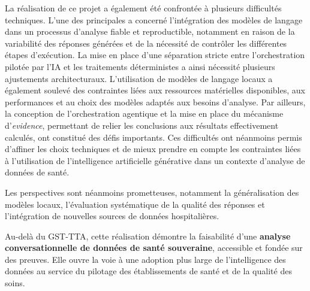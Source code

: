 La réalisation de ce projet a également été confrontée à plusieurs difficultés techniques.
L'une des principales a concerné l'intégration des modèles de langage dans un processus
d'analyse fiable et reproductible, notamment en raison de la variabilité des réponses générées
et de la nécessité de contrôler les différentes étapes d'exécution. La mise en place d'une
séparation stricte entre l'orchestration pilotée par l'IA et les traitements déterministes a
ainsi nécessité plusieurs ajustements architecturaux. L'utilisation de modèles de langage
locaux a également soulevé des contraintes liées aux ressources matérielles disponibles,
aux performances et au choix des modèles adaptés aux besoins d'analyse. Par ailleurs, la
conception de l'orchestration agentique et la mise en place du mécanisme d'\textit{evidence},
permettant de relier les conclusions aux résultats effectivement calculés, ont constitué
des défis importants. Ces difficultés ont néanmoins permis d'affiner les choix techniques
et de mieux prendre en compte les contraintes liées à l'utilisation de l'intelligence
artificielle générative dans un contexte d'analyse de données de santé.

Les perspectives sont néanmoins prometteuses, notamment la généralisation des modèles locaux,
l'évaluation systématique de la qualité des réponses et l'intégration de nouvelles sources
de données hospitalières.

Au-delà du GST-TTA, cette réalisation démontre la faisabilité d'une
\textbf{analyse conversationnelle de données de santé souveraine}, accessible et fondée sur
des preuves. Elle ouvre la voie à une adoption plus large de l'intelligence des données au
service du pilotage des établissements de santé et de la qualité des soins.

